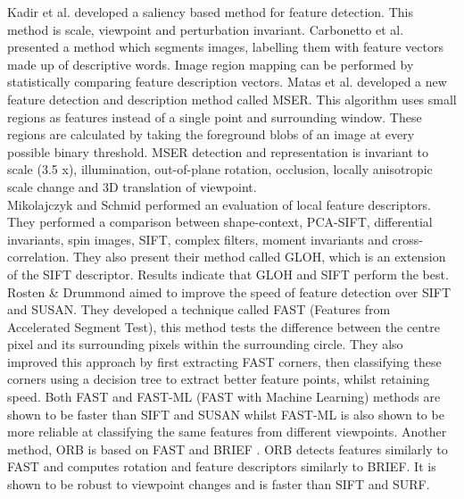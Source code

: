 Kadir et al. \cite{Kadir04Affine} developed a saliency based method for feature detection. This method is scale, viewpoint and perturbation invariant. Carbonetto et al. \cite{Carbonetto04Statistical} presented a method which segments images, labelling them with feature vectors made up of descriptive words. Image region mapping can be performed by statistically comparing feature description vectors. Matas et al. \cite{Matas04Robust} developed a new feature detection and description method called MSER. This algorithm uses small regions as features instead of a single point and surrounding window. These regions are calculated by taking the foreground blobs of an image at every possible binary threshold. MSER detection and representation is invariant to scale (3.5 x), illumination, out-of-plane rotation, occlusion, locally anisotropic scale change and 3D translation of viewpoint. \\

Mikolajczyk and Schmid \cite{Mikolajczyk05Performance} performed an evaluation of local feature descriptors. They performed a comparison between shape-context, PCA-SIFT, differential invariants, spin images, SIFT, complex filters, moment invariants and cross-correlation. They also present their method called GLOH, which is an extension of the SIFT descriptor. Results indicate that GLOH and SIFT perform the best. Rosten \& Drummond \cite{Rosten06Machine,Rosten05Fusing} aimed to improve the speed of feature detection over SIFT and SUSAN. They developed a technique called FAST (Features from Accelerated Segment Test), this method tests the difference between the centre pixel and its surrounding pixels within the surrounding circle. They also improved this approach by first extracting FAST corners, then classifying these corners using a decision tree to extract better feature points, whilst retaining speed. Both FAST and FAST-ML (FAST with Machine Learning) methods are shown to be faster than SIFT and SUSAN whilst FAST-ML is also shown to be more reliable at classifying the same features from different viewpoints. Another method, ORB \cite{Rublee11Orb} is based on FAST and BRIEF \cite{Calonder10Brief}. ORB detects features similarly to FAST and computes rotation and feature descriptors similarly to BRIEF. It is shown to be robust to viewpoint changes and is faster than SIFT and SURF.  \\ 


